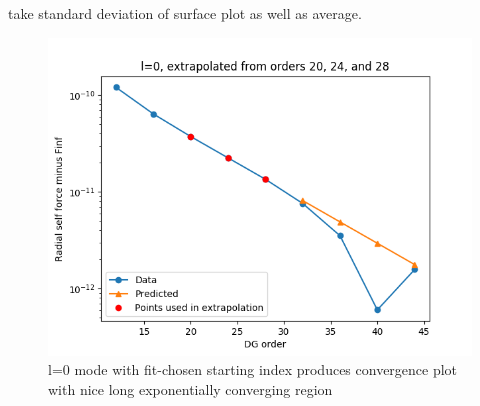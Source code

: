 take standard deviation of surface plot as well as average.
\begin{figure}
  \includegraphics{fittingtechniqet370l0}
  \caption{l=0 mode with fit-chosen starting index produces convergence plot with nice long exponentially converging region}
\end{figure}





